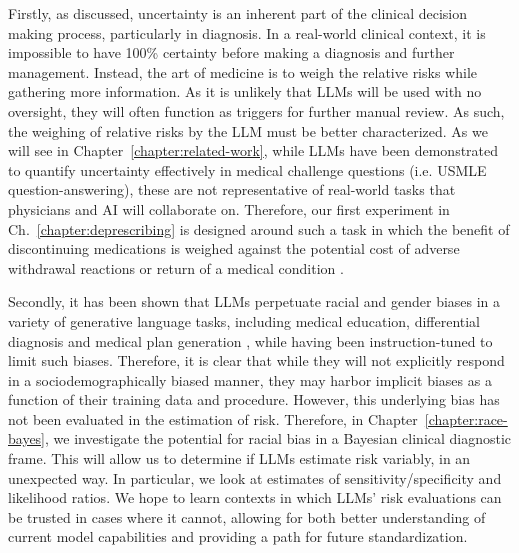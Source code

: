 Firstly, as discussed, uncertainty is an inherent part of the clinical decision making process, particularly in diagnosis. In a real-world clinical context, it is impossible to have 100\% certainty before making a diagnosis and further management. Instead, the art of medicine is to weigh the relative risks while gathering more information. As it is unlikely that LLMs will be used with no oversight, they will often function as triggers for further manual review. As such, the weighing of relative risks by the LLM must be better characterized. As we will see in Chapter~\ref{chapter:related-work}, while LLMs have been demonstrated to quantify uncertainty effectively in medical challenge questions (i.e. USMLE question-answering), these are not representative of real-world tasks that physicians and AI will collaborate on. Therefore, our first experiment in Ch.~\ref{chapter:deprescribing} is designed around such a task in which the benefit of discontinuing medications is weighed against the potential cost of adverse withdrawal reactions or return of a medical condition \cite{reeveBenefitsHarmsDeprescribing2014}. 

Secondly, it has been shown that LLMs perpetuate racial and gender biases in a variety of generative language tasks, including medical education, differential diagnosis and medical plan generation \cite{zackAssessingPotentialGPT42024}, while having been instruction-tuned to limit such biases. Therefore, it is clear that while they will not explicitly respond in a sociodemographically biased manner, they may harbor implicit biases as a function of their training data and procedure. However, this underlying bias has not been evaluated in the estimation of risk. Therefore, in Chapter~\ref{chapter:race-bayes}, we investigate the potential for racial bias in a Bayesian clinical diagnostic frame. This will allow us to determine if LLMs estimate risk variably, in an unexpected way. In particular, we look at estimates of sensitivity/specificity and likelihood ratios. We hope to learn contexts in which LLMs' risk evaluations can be trusted in cases where it cannot, allowing for both better understanding of current model capabilities and providing a path for future standardization.

